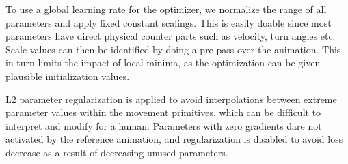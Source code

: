 To use a global learning rate for the optimizer, we normalize the range of all parameters and apply fixed constant scalings. This is easily doable since most parameters have direct physical counter parts such as velocity, turn angles etc. Scale values can then be identified by doing a pre-pass over the animation. This in turn limits the impact of local minima, as the optimization can be given plausible initialization values.

L2 parameter regularization is applied to avoid interpolations between extreme parameter values within the movement primitives, which can be difficult to interpret and modify for a human. Parameters with zero gradients dare not activated by the reference animation, and regularization is disabled to avoid loss decrease as a result of decreasing unused parameters.

